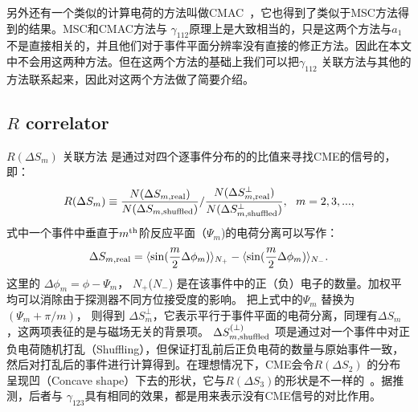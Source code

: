 另外还有一个类似的计算电荷的方法叫做CMAC~\cite{STAR4}，它也得到了类似于MSC方法得到的结果。MSC和CMAC方法与 $\gamma_{112}$原理上是大致相当的，只是这两个方法与$a_1$ 不是直接相关的，并且他们对于事件平面分辨率没有直接的修正方法。因此在本文中不会用这两种方法。但在这两个方法的基础上我们可以把$\gamma_{112}$ 关联方法与其他的方法联系起来，因此对这两个方法做了简要介绍。

\subsection{$R$ correlator}
$R(\Delta S_m)$ 关联方法\cite{RCorr-2011,RCorr-2018} 是通过对四个逐事件分布的的比值来寻找CME的信号的，即：
\begin{equation}
R(\Delta S_m) \equiv \frac{N(\Delta S_{m,\rm real})}{N(\Delta S_{m,\rm shuffled})} / \frac{N(\Delta S^{\perp}_{m,\rm real})}{N(\Delta S^{\perp}_{m,\rm shuffled})}, ~\ m = 2,3,...,
\end{equation}
式中一个事件中垂直于$m^{\rm th}$阶反应平面（$\Psi_m$)的电荷分离可以写作：
\begin{equation}
\Delta S_{m,\rm real} = \langle\sin(\frac{m}{2}\Delta\phi_m)\rangle_{N_+} - \langle\sin(\frac{m}{2}\Delta\phi_m)\rangle_{N_-}.   
\end{equation}
这里的 $\Delta\phi_m = \phi - \Psi_m$， $N_+$($N_-$) 是在该事件中的正（负）电子的数量。加权平均可以消除由于探测器不同方位接受度的影响。 把上式中的$\Psi_m$ 替换为$( \Psi_m + \pi/m)$， 则得到 $\Delta S^{\perp}_m$，它表示平行于事件平面的电荷分离，同理有$\Delta S_m$，这两项表征的是与磁场无关的背景项。
$\Delta S^{(\perp)}_{m,\rm shuffled}$ 项是通过对一个事件中对正负电荷随机打乱（Shuffling），但保证打乱前后正负电荷的数量与原始事件一致，然后对打乱后的事件进行计算得到。在理想情况下，CME会令$R(\Delta S_2)$ 的分布呈现凹（Concave shape）下去的形状，它与$R(\Delta S_3)$的形状是不一样的~\cite{RCorr-2018}。据推测，后者与 $\gamma_{123}$具有相同的效果，都是用来表示没有CME信号的对比作用。

